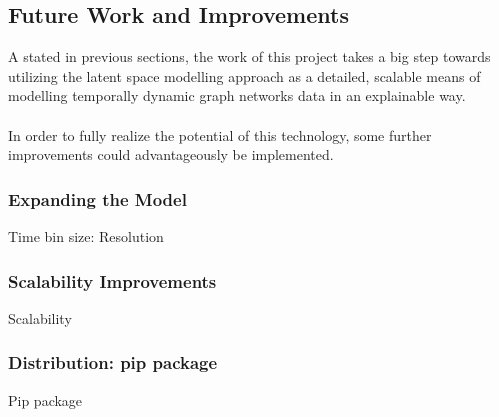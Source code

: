 \subsection{Future Work and Improvements}
\label{sec:Discussion:FutureWork}
A stated in previous sections, the work of this project takes a big step towards utilizing the latent space modelling approach as a detailed, scalable means of modelling temporally dynamic graph networks data in an explainable way.
\\\\
In order to fully realize the potential of this technology, some further improvements could advantageously be implemented.


\subsubsection{Expanding the Model}
\label{sec:Discussion:FutureWork:ModelExpansion}
Time bin size: Resolution



\subsubsection{Scalability Improvements}
\label{sec:Discussion:FutureWork:Scalability}
Scalability



\subsubsection{Distribution: pip package}
\label{sec:Discussion:FutureWork:Pip}

Pip package

